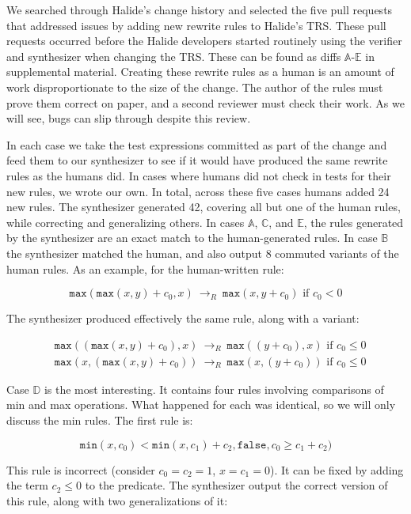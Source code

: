 \documentclass[acmsmall,review,anonymous]{acmart}\settopmatter{printfolios=true,printccs=false,printacmref=false}
\newcommand{\hmax}[0]{\texttt{max}}
\newcommand{\hmin}[0]{\texttt{min}}
\newcommand{\rewrites}[0]{\:\rightarrow_{R}\:}
\newcommand{\pred}[0]{\textrm{ if }}
\newcommand{\hfalse}[0]{\texttt{false}}
\begin{document}
We searched through Halide’s change history and selected the five pull requests that addressed issues by adding new rewrite rules to Halide’s TRS. These pull requests occurred before the Halide developers started routinely using the verifier and synthesizer when changing the TRS. These can be found as diffs $\mathbb{A}$-$\mathbb{E}$ in supplemental material. Creating these rewrite rules as a human is an amount of work disproportionate to the size of the change. The author of the rules must prove them correct on paper, and a second reviewer must check their work. As we will see, bugs can slip through despite this review. 

In each case we take the test expressions committed as part of the change and feed them to our synthesizer to see if it would have produced the same rewrite rules as the humans did. In cases where humans did not check in tests for their new rules, we wrote our own. In total, across these five cases humans added 24 new rules. The synthesizer generated 42, covering all but one of the human rules, while correcting and generalizing others. In cases $\mathbb{A}$, $\mathbb{C}$, and $\mathbb{E}$, the rules generated by the synthesizer are an exact match to the human-generated rules. In case $\mathbb{B}$ the synthesizer matched the human, and also output 8 commuted variants of the human rules. As an example, for the human-written rule:

\[
\hmax(\hmax(x, y) + c_0, x) \rewrites \hmax(x, y + c_0) \pred c_0 < 0
\]

The synthesizer produced effectively the same rule, along with a variant:

\begin{align*}
& \hmax((\hmax(x, y) + c_0), x) \rewrites \hmax((y + c_0), x) \pred c_0 \leq 0 \\
& \hmax(x, (\hmax(x, y) + c_0)) \rewrites \hmax(x, (y + c_0)) \pred c_0 \leq 0
\end{align*}

Case $\mathbb{D}$ is the most interesting. It contains four rules involving comparisons of min and max operations. What happened for each was identical, so we will only discuss the min rules. The first rule is:

\[
\hmin(x, c_0) < \hmin(x, c_1) + c_2, \hfalse, c_0 \geq c_1 + c_2)
\]

This rule is incorrect (consider $c_0 = c_2 = 1$, $x = c_1 = 0$). It can be fixed by adding the term $c_2 \leq 0$ to the predicate. The synthesizer output the correct version of this rule, along with two generalizations of it:
\end{document}
